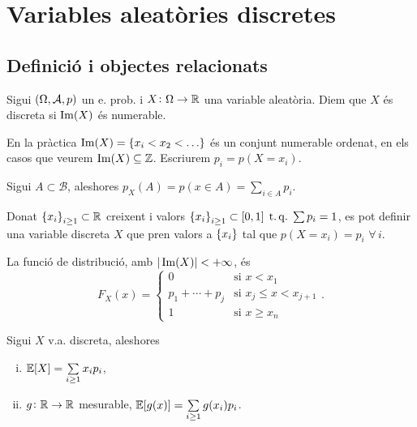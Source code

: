 \chapter{Variables aleatòries discretes}

\section[Definició i objectes relacionats]
    {Definició i objectes relacionats
    }

\begin{defi}
    Sigui $\left( \Omega, \mathcal{A}, p\right)$ un e. prob. i $X\colon \Omega\to\mathbb{R}$ una variable aleatòria. Diem que $X$ és discreta si
    $\operatorname{Im}(X)$ és numerable.
\end{defi}

\begin{obs}
    En la pràctica $\im(X) = \lc x_i < x_2 < \dots \rc$ és un conjunt numerable ordenat, en els casos que veurem $\operatorname{Im}(X)\subseteq\mathbb{Z}$.
    Escriurem $p_i = p(X=x_i)$.
\end{obs}

\begin{obs}
    Sigui $A\subset\mathcal{B}$, aleshores $p_X(A) = p(x\in A) = \sum_{i\in A}{p_i}$.
\end{obs}

\begin{obs}
    Donat $\left\{ x_i \right\}_{i \ge 1} \subset\mathbb{R}$ creixent i valors $\left\{ x_i \right\}_{i \ge 1} \subset [0,1] \operatorname{\;t.q.\;} \sum{p_i}=1$, es pot definir
    una variable discreta $X$ que pren valors a $\left\{ x_i \right\}$ tal que $p(X=x_i) = p_i$ $\forall\,i$.
\end{obs}

\begin{obs}
    La funció de distribució, amb $|\operatorname{Im}(X)|<+\infty$, és
    \[F_X(x) = \begin{cases}
        0 &\text{si } x<x_1\\
        p_1+\cdots+p_j &\text{si } x_j \le x < x_{j+1}\\
        1 &\text{si } x \ge x_n
    \end{cases}.\]
\end{obs}

\begin{prop} Sigui $X$ v.a. discreta, aleshores
    \begin{enumerate}[i)]
        \item $\operatorname{\mathbb{E}}[X] = \sum\limits_{i \ge 1}{x_i p_i}$,
        \item $g\colon \mathbb{R}\to\mathbb{R}$ mesurable, $\operatorname{\mathbb{E}}[g(x)] = \sum\limits_{i \ge 1}{g(x_i) p_i}$.
    \end{enumerate}
\end{prop}

